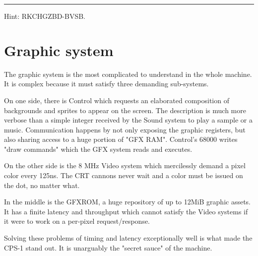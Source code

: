 
\par\noindent\rule{\textwidth}{0.5pt}





Hint: RKCHGZBD-BVSB.














\section{Graphic system}


The graphic system is the most complicated to understand in the whole machine. It is complex because it must satisfy three demanding sub-systems.



On one side, there is Control which requests an elaborated composition of backgrounds and sprites to appear on the screen. The description is much more verbose than a simple integer received by the Sound system to play a sample or a music. Communication happens by not only exposing the graphic registers, but also sharing access to a huge portion of "GFX RAM". Control's 68000 writes "draw commands" which the GFX system reads and executes.

On the other side is the 8 MHz Video system which mercilessly demand a pixel color every 125ns. The CRT cannons never wait and a color must be issued on the dot, no matter what. 

In the middle is the GFXROM, a huge repository of up to 12MiB graphic assets. It has a finite latency and throughput which cannot satisfy the Video systems if it were to work on a per-pixel request/response.

Solving these problems of timing and latency exceptionally well is what made the CPS-1 stand out. It is unarguably the "secret sauce" of the machine. 


